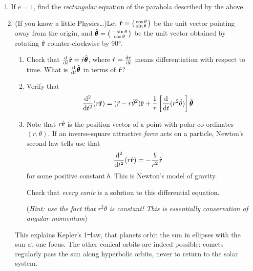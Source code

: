 \begin{exercises}{}{}
\def\hvr{\hat{\vr}}
\def\hth{\hat{\pmb\theta}}
\hangindent\leftmargini
\textup{1. } If $e=1$, find the \emph{rectangular} equation of the parabola described by the above.
\begin{enumerate}\setcounter{enumi}{1}
  \item (If you know a little Physics\ldots)\quad Let $\hvr=\stwovec{\cos\theta}{\sin\theta}$ be the unit vector pointing away from the origin, and $\hth=\stwovec{-\sin\theta}{\cos\theta}$ be the unit vector obtained by rotating $\hvr$ counter-clockwise by \ang{90}.
  \begin{enumerate}
    \item Check that $\diff t\hvr=\dot r\hth$, where $\dot r=\diff[r]{t}$ means differentiation with respect to time. What is $\diff t\hth$ in terms of $\hvr$?
    \item Verify that
    \[\diff[^2]{t^2}(r\hvr) =(\ddot r-r\dot\theta^2)\hvr+\frac 1r\left[\diff t(r^2\dot\theta)\right]\hth\]
    \item Note that $r\hvr$ is the position vector of a point with polar co-ordinates $(r,\theta)$. If an inverse-square attractive \emph{force} acts on a particle, Newton's second law tells use that
    \[\diff[^2]{t^2}(r\hvr) =-\frac b{r^2}\hvr\]
    for some positive constant $b$. This is Newton's model of gravity.\par
    Check that \emph{every conic} is a solution to this differential equation.\par
    (\emph{Hint: use the fact that $r^2\dot\theta$ is constant! This is essentially conservation of angular momentum}) 
  \end{enumerate}
  This explains Kepler's 1\st\ law, that planets orbit the sun in ellipses with the sun at one focus. The other conical orbits are indeed possible: comets regularly pass the sun along hyperbolic orbits, never to return to the solar system.
\end{enumerate}
\end{exercises}


\fi

% 
% 
% 
% 
% 


